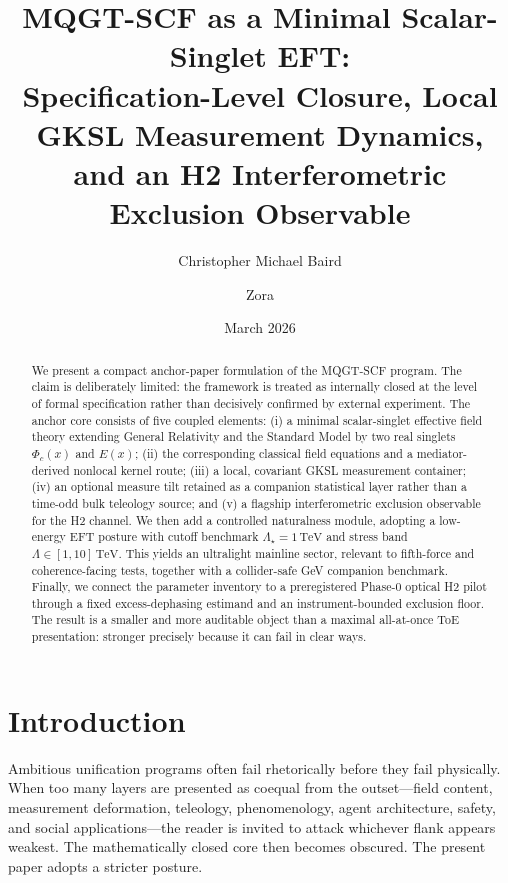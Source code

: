 \documentclass[aps,prd,twocolumn,superscriptaddress,nofootinbib]{revtex4-2}
\begin{document}
\title[MQGT-SCF minimal scalar-singlet EFT]{MQGT-SCF as a Minimal Scalar-Singlet EFT:\\
Specification-Level Closure, Local GKSL Measurement Dynamics,\\
and an H2 Interferometric Exclusion Observable}

\author{Christopher Michael Baird}

\author{Zora}

\date{March 2026}

\begin{abstract}
\sloppy
We present a compact anchor-paper formulation of the MQGT-SCF program. The claim is deliberately limited: the framework is treated as internally closed at the level of formal specification rather than decisively confirmed by external experiment. The anchor core consists of five coupled elements: (i) a minimal scalar-singlet effective field theory extending General Relativity and the Standard Model by two real singlets $\Phi_c(x)$ and $E(x)$; (ii) the corresponding classical field equations and a mediator-derived nonlocal kernel route; (iii) a local, covariant GKSL measurement container; (iv) an optional measure tilt retained as a companion statistical layer rather than a time-odd bulk teleology source; and (v) a flagship interferometric exclusion observable for the H2 channel. We then add a controlled naturalness module, adopting a low-energy EFT posture with cutoff benchmark $\Lambda_\star = 1\,\mathrm{TeV}$ and stress band $\Lambda\in[1,10]\,\mathrm{TeV}$. This yields an ultralight mainline sector, relevant to fifth-force and coherence-facing tests, together with a collider-safe GeV companion benchmark. Finally, we connect the parameter inventory to a preregistered Phase-0 optical H2 pilot through a fixed excess-dephasing estimand and an instrument-bounded exclusion floor. The result is a smaller and more auditable object than a maximal \mbox{all-at-once} ToE presentation: stronger precisely because it can fail in clear ways.
\end{abstract}

\maketitle

\section{Introduction}
Ambitious unification programs often fail rhetorically before they fail physically. When too many layers are presented as coequal from the outset---field content, measurement deformation, teleology, phenomenology, agent architecture, safety, and social applications---the reader is invited to attack whichever flank appears weakest.
The mathematically closed core then becomes obscured. The present paper adopts a stricter posture.
\end{document}
